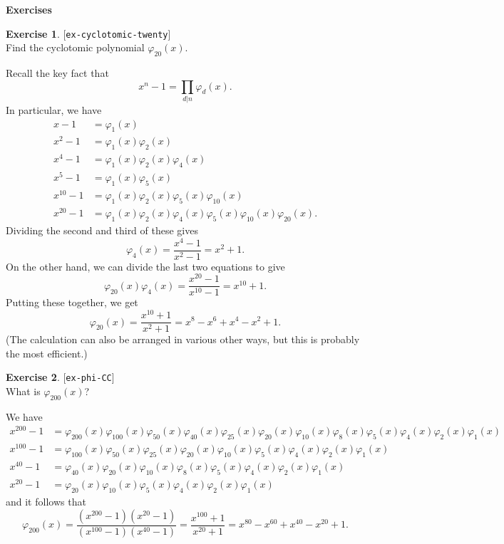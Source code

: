 \documentclass{amsart}
\newcommand{\vph}       {\varphi}
\renewcommand{\:}{\colon}
\newcommand{\lastexlabel}{}
\newcommand{\exlabel}[1]{
 \global\def\lastexlabel{#1}\label{#1}[\texttt{#1}]\ \\
}
\newcommand{\exlabel}[1]{
 \global\def\lastexlabel{#1}\label{#1}
}
\newenvironment{solution}{\SolutionInline}{\endSolutionInline}
\theoremstyle{definition}
\newtheorem{exercise}{Exercise}[section]
\renewenvironment{solution}{\SolutionAtEnd}{\endSolutionAtEnd}
\begin{document}
\begin{center}
 \Large \textbf{Exercises}
\end{center}

\begin{exercise}\exlabel{ex-cyclotomic-twenty}
 Find the cyclotomic polynomial $\vph_{20}(x)$.
\end{exercise}
\begin{solution}
 Recall the key fact that 
 \[ x^n-1 = \prod_{d|n} \vph_d(x). \]
 In particular, we have
 \begin{align*}
  x-1 &= \vph_1(x) \\
  x^2-1 &= \vph_1(x)\vph_2(x) \\
  x^4-1 &= \vph_1(x)\vph_2(x)\vph_4(x) \\
  x^5-1 &= \vph_1(x)\vph_5(x) \\
  x^{10}-1 &= \vph_1(x)\vph_{2}(x)\vph_5(x)\vph_{10}(x) \\
  x^{20}-1 &= \vph_1(x)\vph_{2}(x)\vph_4(x)
              \vph_5(x)\vph_{10}(x)\vph_{20}(x).
 \end{align*}
 Dividing the second and third of these gives
 \[ \vph_4(x) = \frac{x^4-1}{x^2-1} = x^2+1. \]
 On the other hand, we can divide the last two equations to give
 \[ \vph_{20}(x)\vph_4(x) = 
     \frac{x^{20}-1}{x^{10}-1} = x^{10}+1.
 \]
 Putting these together, we get
 \[ \vph_{20}(x) = 
     \frac{x^{10}+1}{x^2+1} = x^8-x^6+x^4-x^2+1.
 \]
 (The calculation can also be arranged in various other ways, but this
 is probably the most efficient.)
\end{solution}

\begin{exercise}\exlabel{ex-phi-CC}
 What is $\vph_{200}(x)$?
\end{exercise}
\begin{solution}
 We have
 \begin{align*}
  x^{200}-1 &=
   \vph_{200}(x)\vph_{100}(x)\vph_{50}(x)\vph_{40}(x)
   \vph_{25}(x)\vph_{20}(x)\vph_{10}(x)\vph_8(x)\vph_5(x)
   \vph_4(x)\vph_2(x)\vph_1(x)\\
  x^{100}-1 &=
   \vph_{100}(x)\vph_{50}(x)\vph_{25}(x)\vph_{20}(x)
   \vph_{10}(x)\vph_5(x)\vph_4(x)\vph_2(x)\vph_1(x)\\
  x^{40}-1  &=
   \vph_{40}(x)\vph_{20}(x)\vph_{10}(x)\vph_8(x)
   \vph_5(x)\vph_4(x)\vph_2(x)\vph_1(x)\\
  x^{20}-1  &=
   \vph_{20}(x)\vph_{10}(x)\vph_5(x)\vph_4(x)\vph_2(x)\vph_1(x)
 \end{align*}
 and it follows that
 \[ \vph_{200}(x) =
     \frac{(x^{200}-1)(x^{20}-1)}{(x^{100}-1)(x^{40}-1)} = 
     \frac{x^{100}+1}{x^{20}+1} =
      x^{80}-x^{60}+x^{40}-x^{20}+1.
 \]
\end{solution}
\end{document}
